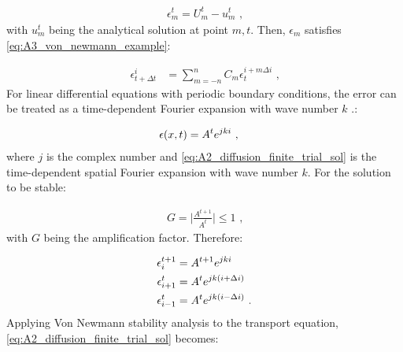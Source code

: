 \begin{equation}
    \begin{aligned}
        \epsilon_m^t=U_m^t-u_m^t\text{ ,} 
    \end{aligned} \label{eq:A2_error_function}
\end{equation}
\noindent with $u_m^t$ being the analytical solution at point $m,t$. Then, $\epsilon_m$ satisfies \autoref{eq:A3_von_newmann_example}:

\begin{equation}
    \begin{aligned}
        \epsilon_{t+\Delta t}^i&=\sum_{m=-n}^n C_m \epsilon_t^{i+m\Delta i}\text{ ,} 
    \end{aligned}
\end{equation}
\noindent For linear differential equations with periodic boundary conditions, the error can be treated as a time-dependent Fourier expansion with wave number $k$ \citep{cdi_wiley_ebooks_10_1002_9783527683147_ch11_ch11}.:

\begin{equation}
    \begin{aligned}
    \epsilon\qty(x,t)&=A^te^{jki}\text{ ,} 
    \end{aligned} \label{eq:A2_diffusion_finite_trial_sol}
\end{equation}
\noindent where $j$ is the complex number and \autoref{eq:A2_diffusion_finite_trial_sol} is the time-dependent spatial Fourier expansion with wave number $k$. For the solution to be stable:

\begin{equation}
    \begin{aligned}
        G=\bigg| \frac{A^{t+1}}{A^t}\bigg| \leq 1\text{ ,} 
    \end{aligned}
\end{equation} 
\noindent with $G$ being the amplification factor. Therefore:

\begin{equation}
    \begin{aligned}
    \epsilon_i^{t+1}&= A^{t+1}e^{jki} \\
    \epsilon_{i+1}^{t}&= A^{t}e^{jk\qty(i+\Delta i)} \\
    \epsilon_{i-1}^{t}&= A^{t}e^{jk\qty(i-\Delta i)}\text{ .} 
    \end{aligned} \label{eq:A2_diffusion_finite_trial_sol2}
\end{equation}
Applying Von Newmann stability analysis to the transport equation, \autoref{eq:A2_diffusion_finite_trial_sol} becomes:

